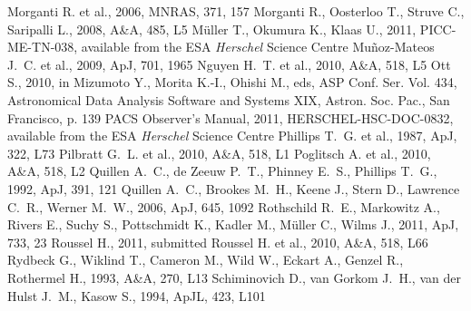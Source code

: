 \documentclass[useAMS,usenatbib,usegraphicx]{mn2e}
\newcommand{\apj}{ApJ}                 %
\newcommand{\apjl}{ApJL}               %
\newcommand{\aap}{A\&A}                %
\newcommand{\mnras}{MNRAS}             %
\begin{document}
\begin{thebibliography}{}
 Morganti R. et al., 2006, \mnras, 371, 157
 Morganti R., Oosterloo T., Struve C., Saripalli L., 2008, \aap, 485, L5
 M{\"u}ller T., Okumura K., Klaas U., 2011, PICC-ME-TN-038, available from the ESA \emph{Herschel} Science Centre
 Mu{\~n}oz-Mateos J.~C. et al., 2009, \apj, 701, 1965
 Nguyen H.~T. et al., 2010, \aap, 518, L5
 Ott S., 2010, in Mizumoto Y., Morita K.-I., Ohishi M., eds, ASP Conf. Ser. Vol. 434, Astronomical Data Analysis Software and Systems XIX, Astron. Soc. Pac., San Francisco, p. 139
 PACS Observer's Manual, 2011, HERSCHEL-HSC-DOC-0832, available from the ESA \emph{Herschel} Science Centre
 Phillips T.~G. et al., 1987, \apj, 322, L73
 Pilbratt G.~L. et al., 2010, \aap, 518, L1
 Poglitsch A. et al., 2010, \aap, 518, L2
 Quillen A.~C., de Zeeuw P.~T., Phinney E.~S., Phillips T.~G., 1992, \apj, 391, 121
 Quillen A.~C., Brookes M.~H., Keene J., Stern D., Lawrence C.~R., Werner M.~W., 2006, \apj, 645, 1092
 Rothschild R.~E., Markowitz A., Rivers E., Suchy S., Pottschmidt K., Kadler M., M{\"u}ller C., Wilms J., 2011, \apj, 733, 23
 Roussel H., 2011, submitted
 Roussel H. et al., 2010, \aap, 518, L66
 Rydbeck G., Wiklind T., Cameron M., Wild W., Eckart A., Genzel R., Rothermel H., 1993, \aap, 270, L13
 Schiminovich D., van Gorkom J.~H., van der Hulst J.~M., Kasow S., 1994, \apjl, 423, L101

\end{thebibliography}
\end{document}
